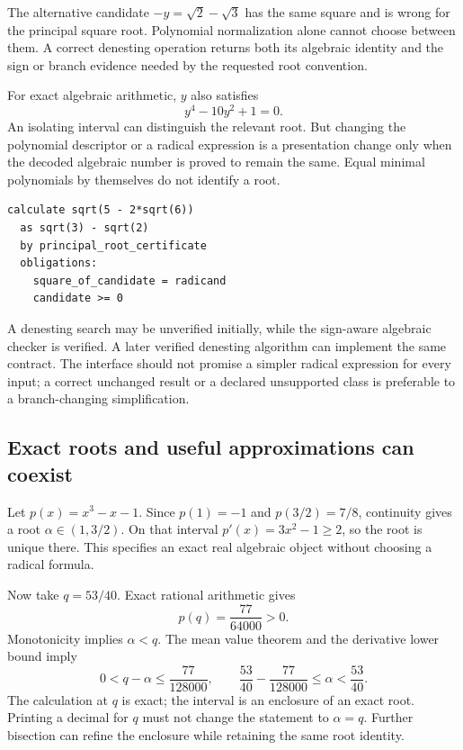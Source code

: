 \documentclass[11pt,letterpaper]{article}
\numberwithin{equation}{section}
\begin{document}
The alternative candidate $-y=\sqrt2-\sqrt3$ has the same square and is wrong
for the principal square root. Polynomial normalization alone cannot choose
between them. A correct denesting operation returns both its algebraic
identity and the sign or branch evidence needed by the requested root convention.

For exact algebraic arithmetic, $y$ also satisfies
\[
 y^4-10y^2+1=0.
\]
An isolating interval can distinguish the relevant root. But changing the
polynomial descriptor or a radical expression is a presentation change only when
the decoded algebraic number is proved to remain the same. Equal minimal
polynomials by themselves do not identify a root.

\par\noindent\begin{minipage}{\linewidth}
\begin{lstlisting}
calculate sqrt(5 - 2*sqrt(6))
  as sqrt(3) - sqrt(2)
  by principal_root_certificate
  obligations:
    square_of_candidate = radicand
    candidate >= 0
\end{lstlisting}
\end{minipage}\par


A denesting search may be unverified initially, while the sign-aware algebraic
checker is verified. A later verified denesting algorithm can implement the
same contract. The interface should not promise a simpler radical expression
for every input; a correct unchanged result or a declared unsupported class is
preferable to a branch-changing simplification.

\subsection{Exact roots and useful approximations can coexist}
Let $p(x)=x^3-x-1$. Since $p(1)=-1$ and $p(3/2)=7/8$, continuity gives a root
$\alpha\in(1,3/2)$. On that interval $p'(x)=3x^2-1\ge2$, so the root is unique
there. This specifies an exact real algebraic object without choosing a radical
formula.

Now take $q=53/40$. Exact rational arithmetic gives
\[
 p(q)=\frac{77}{64000}>0.
\]
Monotonicity implies $\alpha<q$. The mean value theorem and the derivative lower
bound imply
\begin{equation}
 0<q-\alpha\le\frac{77}{128000},
 \qquad
 \frac{53}{40}-\frac{77}{128000}\le\alpha<\frac{53}{40}. \label{eq:enclosure}
\end{equation}
The calculation at $q$ is exact; the interval is an enclosure of an exact root.
Printing a decimal for $q$ must not change the statement to $\alpha=q$.
Further bisection can refine the enclosure while retaining the same root identity.
\end{document}
